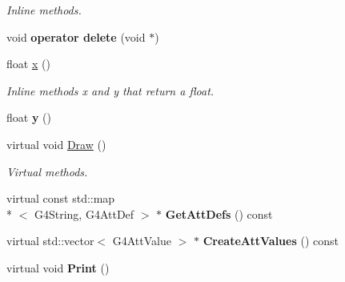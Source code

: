 \begin{DoxyCompactItemize}
\begin{DoxyCompactList}\small\item\em Inline methods. \end{DoxyCompactList}\item 
\hypertarget{classEMMADriftChamberHit_a327d8eda9ffe3c466aa6c5375fb8b1bc}{void {\bfseries operator delete} (void $\ast$)}\label{classEMMADriftChamberHit_a327d8eda9ffe3c466aa6c5375fb8b1bc}

\item 
\hypertarget{classEMMADriftChamberHit_ac55f7e4ec4ab486310fe9e8a43784fec}{float \hyperlink{classEMMADriftChamberHit_ac55f7e4ec4ab486310fe9e8a43784fec}{x} ()}\label{classEMMADriftChamberHit_ac55f7e4ec4ab486310fe9e8a43784fec}

\begin{DoxyCompactList}\small\item\em Inline methods x and y that return a float. \end{DoxyCompactList}\item 
\hypertarget{classEMMADriftChamberHit_afd5a3604f426ac37b58ac2cae1cecba8}{float {\bfseries y} ()}\label{classEMMADriftChamberHit_afd5a3604f426ac37b58ac2cae1cecba8}

\item 
\hypertarget{classEMMADriftChamberHit_ab5c31e999289cfcfb220db6e76f51d9d}{virtual void \hyperlink{classEMMADriftChamberHit_ab5c31e999289cfcfb220db6e76f51d9d}{Draw} ()}\label{classEMMADriftChamberHit_ab5c31e999289cfcfb220db6e76f51d9d}

\begin{DoxyCompactList}\small\item\em Virtual methods. \end{DoxyCompactList}\item 
\hypertarget{classEMMADriftChamberHit_a6fc59cd913a749f9deef6abd412a5710}{virtual const std\-::map\\*
$<$ G4\-String, G4\-Att\-Def $>$ $\ast$ {\bfseries Get\-Att\-Defs} () const }\label{classEMMADriftChamberHit_a6fc59cd913a749f9deef6abd412a5710}

\item 
\hypertarget{classEMMADriftChamberHit_a5b24dc1d921c6bbdb6e7dc6028a1abc9}{virtual std\-::vector$<$ G4\-Att\-Value $>$ $\ast$ {\bfseries Create\-Att\-Values} () const }\label{classEMMADriftChamberHit_a5b24dc1d921c6bbdb6e7dc6028a1abc9}

\item 
\hypertarget{classEMMADriftChamberHit_a45fe874659cbba33a958001146b444e0}{virtual void {\bfseries Print} ()}\label{classEMMADriftChamberHit_a45fe874659cbba33a958001146b444e0}


\end{DoxyCompactItemize}
